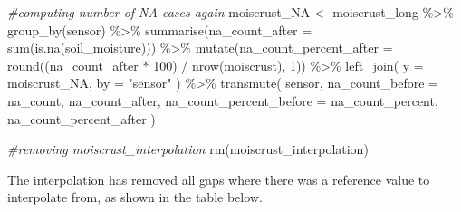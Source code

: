 \documentclass[
  table]{article}
\newenvironment{Shaded}{\begin{snugshade}}{\end{snugshade}}
\newcommand{\AttributeTok}[1]{\textcolor[rgb]{0.77,0.63,0.00}{#1}}
\newcommand{\CommentTok}[1]{\textcolor[rgb]{0.56,0.35,0.01}{\textit{#1}}}
\newcommand{\DecValTok}[1]{\textcolor[rgb]{0.00,0.00,0.81}{#1}}
\newcommand{\FunctionTok}[1]{\textcolor[rgb]{0.00,0.00,0.00}{#1}}
\newcommand{\NormalTok}[1]{#1}
\newcommand{\OtherTok}[1]{\textcolor[rgb]{0.56,0.35,0.01}{#1}}
\newcommand{\SpecialCharTok}[1]{\textcolor[rgb]{0.00,0.00,0.00}{#1}}
\newcommand{\StringTok}[1]{\textcolor[rgb]{0.31,0.60,0.02}{#1}}
\begin{document}
\begin{Shaded}
\begin{Highlighting}[]
\CommentTok{\#computing number of NA cases again}
\NormalTok{moiscrust\_NA }\OtherTok{\textless{}{-}}\NormalTok{ moiscrust\_long }\SpecialCharTok{\%\textgreater{}\%} 
  \FunctionTok{group\_by}\NormalTok{(sensor) }\SpecialCharTok{\%\textgreater{}\%} 
  \FunctionTok{summarise}\NormalTok{(}\AttributeTok{na\_count\_after =} \FunctionTok{sum}\NormalTok{(}\FunctionTok{is.na}\NormalTok{(soil\_moisture))) }\SpecialCharTok{\%\textgreater{}\%} 
  \FunctionTok{mutate}\NormalTok{(}\AttributeTok{na\_count\_percent\_after =} \FunctionTok{round}\NormalTok{((na\_count\_after }\SpecialCharTok{*} \DecValTok{100}\NormalTok{) }\SpecialCharTok{/} \FunctionTok{nrow}\NormalTok{(moiscrust), }\DecValTok{1}\NormalTok{)) }\SpecialCharTok{\%\textgreater{}\%} 
  \FunctionTok{left\_join}\NormalTok{(}
    \AttributeTok{y =}\NormalTok{ moiscrust\_NA,}
    \AttributeTok{by =} \StringTok{"sensor"}
\NormalTok{  ) }\SpecialCharTok{\%\textgreater{}\%} 
  \FunctionTok{transmute}\NormalTok{(}
\NormalTok{    sensor,}
    \AttributeTok{na\_count\_before =}\NormalTok{ na\_count,}
\NormalTok{    na\_count\_after,}
    \AttributeTok{na\_count\_percent\_before =}\NormalTok{ na\_count\_percent,}
\NormalTok{    na\_count\_percent\_after}
\NormalTok{  )}

\CommentTok{\#removing moiscrust\_interpolation}
\FunctionTok{rm}\NormalTok{(moiscrust\_interpolation)}
\end{Highlighting}
\end{Shaded}

The interpolation has removed all gaps where there was a reference value
to interpolate from, as shown in the table below.
\end{document}

